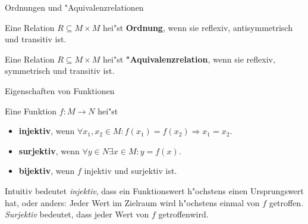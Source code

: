 \documentclass{beamer}
\begin{document}
  \begin{frame}{Ordnungen und "Aquivalenzrelationen}
    \begin{definition}[Ordnungen]
      Eine Relation $R\subseteq M\times M$ hei"st \textbf{Ordnung}, wenn sie reflexiv, antisymmetrisch und transitiv ist.
    \end{definition}
    \begin{definition}["Aquivalenzrelationen]
      Eine Relation $R\subseteq M\times M$ hei"st \textbf{"Aquivalenzrelation}, wenn sie reflexiv, symmetrisch und transitiv ist.
    \end{definition}
  \end{frame}
\begin{frame}{Eigenschaften von Funktionen}
\begin{definition}
  Eine Funktion $f:M\to N$ hei"st 
  \begin{itemize}
    \item \textbf{injektiv}, wenn $\forall x_1,x_2\in M:f(x_1)=f(x_2)\Rightarrow x_1=x_2$.
    \item \textbf{surjektiv}, wenn $\forall y\in N\exists x\in M:y=f(x)$.
    \item \textbf{bijektiv}, wenn $f$ injektiv und surjektiv ist.
  \end{itemize}
\end{definition}
Intuitiv bedeutet \textit{injektiv}, dass ein Funktionswert h"ochstens einen Ursprungswert hat, oder anders: Jeder Wert im Zielraum wird h"ochstens einmal von $f$ \glqq getroffen\grqq. \textit{Surjektiv} bedeutet, dass jeder Wert von $f$ \glqq getroffen\grqq wird.
\end{frame}
\end{document}
